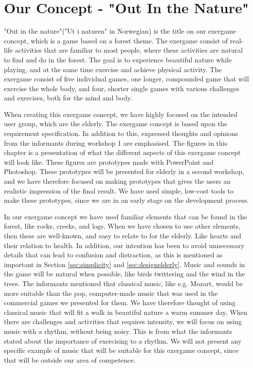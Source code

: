 \section{Our Concept - "Out In the Nature"}
\label{sec:outinthenature}

"Out in the nature"("Ut i naturen" in Norwegian) is the title on our exergame concept, which is a game based on a forest theme. The exergame consist of real-life activities that are familiar to most people, where these activities are natural to find and do in the forest. The goal is to experience beautiful nature while playing, and at the same time exercise and achieve physical activity. The exergame consist of five individual games, one longer, compounded game that will exercise the whole body, and four, shorter single games with various challenges and exercises, both for the mind and body.    

When creating this exergame concept, we have highly focused on the intended user group, which are the elderly. The exergame concept is based upon the requirement specification. In addition to this, expressed thoughts and opinions from the informants during workshop 1 are emphasised. The figures in this chapter is a presentation of what the different aspects of this exergame concept will look like. These figures are prototypes made with PowerPoint and Photoshop. These prototypes will be presented for elderly in a second workshop, and we have therefore focused on making prototypes that gives the users an realistic impression of the final result. We have used simple, low-cost tools to make these prototypes, since we are in an early stage on the development process.     

In our exergame concept we have used familiar elements that can be found in the forest, like rocks, creeks, and logs. When we have chosen to use other elements, then these are well-known, and easy to relate to for the elderly. Like hearts and their relation to health. In addition, our intention has been to avoid unnecessary details that can lead to confusion and distraction, as this is mentioned as important in Section \ref{sec:simplicity} and \ref{sec:designelderly}. Music and sounds in the game will be natural when possible, like birds twittering and the wind in the trees. The informants mentioned that classical music, like e.g. Mozart, would be more suitable than the pop, computer-made music that was used in the commercial games we presented for them. We have therefore thought of using classical music that will fit a walk in beautiful nature a warm summer day. When there are challenges and activities that requires intensity, we will focus on using music with a rhythm, without being noisy. This is from what the informants stated about the importance of exercising to a rhythm. We will not present any specific example of music that will be suitable for this exergame concept, since that will be outside our area of competence. 

